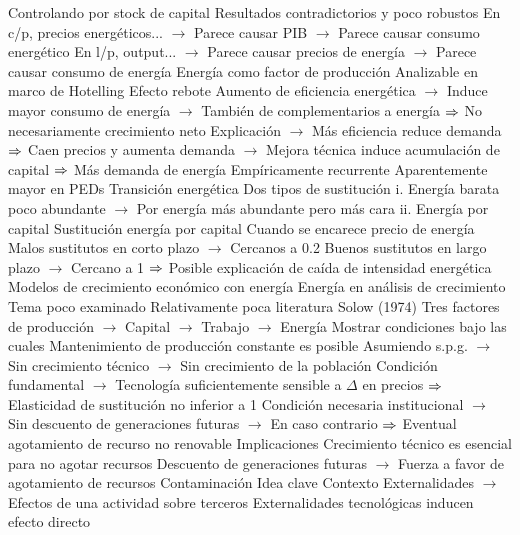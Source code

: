 \documentclass{nuevotema}
\begin{document}
\begin{esquemal}
				\4 Controlando por stock de capital
				\4[] Resultados contradictorios y poco robustos
				\4[] En c/p, precios energéticos...
				\4[] $\to$ Parece causar PIB
				\4[] $\to$ Parece causar consumo energético
				\4[] En l/p, output...
				\4[] $\to$ Parece causar precios de energía
				\4[] $\to$ Parece causar consumo de energía
			\3 Energía como factor de producción
				\4 Analizable en marco de Hotelling
				\4 Efecto rebote
				\4[] Aumento de eficiencia energética
				\4[] $\to$ Induce mayor consumo de energía
				\4[] $\to$ También de complementarios a energía
				\4[] $\Rightarrow$ No necesariamente crecimiento neto
				\4[] Explicación
				\4[] $\to$ Más eficiencia reduce demanda
				\4[] $\Rightarrow$ Caen precios y aumenta demanda
				\4[] $\to$ Mejora técnica induce acumulación de capital
				\4[] $\Rightarrow$ Más demanda de energía
				\4[] Empíricamente recurrente
				\4[] Aparentemente mayor en PEDs
			\3 Transición energética
				\4 Dos tipos de sustitución
				\4[] i. Energía barata poco abundante
				\4[] $\to$ Por energía más abundante pero más cara
				\4[] ii. Energía por capital
				\4 Sustitución energía por capital
				\4[] Cuando se encarece precio de energía
				\4[] Malos sustitutos en corto plazo
				\4[] $\to$ Cercanos a 0.2
				\4[] Buenos sustitutos en largo plazo
				\4[] $\to$ Cercano a 1
				\4[] $\Rightarrow$ Posible explicación de caída de intensidad energética
			\3 Modelos de crecimiento económico con energía
				\4 Energía en análisis de crecimiento
				\4[] Tema poco examinado
				\4[] Relativamente poca literatura
				\4 Solow (1974)
				\4 Tres factores de producción
				\4[] $\to$ Capital
				\4[] $\to$ Trabajo
				\4[] $\to$ Energía
				\4 Mostrar condiciones bajo las cuales
				\4[] Mantenimiento de producción constante es posible
				\4[] Asumiendo s.p.g.
				\4[] $\to$ Sin crecimiento técnico
				\4[] $\to$ Sin crecimiento de la población
				\4[] Condición fundamental
				\4[] $\to$ Tecnología suficientemente sensible a $\Delta$ en precios
				\4[] $\Rightarrow$ Elasticidad de sustitución no inferior a 1
				\4[] Condición necesaria institucional
				\4[] $\to$ Sin descuento de generaciones futuras
				\4[] $\to$ En caso contrario
				\4[] $\Rightarrow$ Eventual agotamiento de recurso no renovable
				\4 Implicaciones
				\4[] Crecimiento técnico es esencial para no agotar recursos
				\4[] Descuento de generaciones futuras
				\4[] $\to$ Fuerza a favor de agotamiento de recursos
		\2 Contaminación
			\3 Idea clave
				\4 Contexto
				\4[] Externalidades
				\4[] $\to$ Efectos de una actividad sobre terceros
				\4[] Externalidades tecnológicas inducen efecto directo

\end{esquemal}
\end{document}
